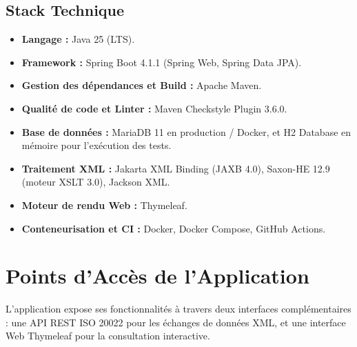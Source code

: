 \documentclass[12pt,a4paper]{article}
\begin{document}
\subsection{Stack Technique}

\begin{itemize}[leftmargin=*]
    \item \textbf{Langage :} Java 25 (LTS).
    \item \textbf{Framework :} Spring Boot 4.1.1 (Spring Web, Spring Data JPA).
    \item \textbf{Gestion des dépendances et Build :} Apache Maven.
    \item \textbf{Qualité de code et Linter :} Maven Checkstyle Plugin 3.6.0.
    \item \textbf{Base de données :} MariaDB 11 en production / Docker, et H2 Database en mémoire pour l'exécution des tests.
    \item \textbf{Traitement XML :} Jakarta XML Binding (JAXB 4.0), Saxon-HE 12.9 (moteur XSLT 3.0), Jackson XML.
    \item \textbf{Moteur de rendu Web :} Thymeleaf.
    \item \textbf{Conteneurisation et CI :} Docker, Docker Compose, GitHub Actions.
\end{itemize}

\newpage

\section{Points d'Accès de l'Application}

L'application expose ses fonctionnalités à travers deux interfaces complémentaires : une API REST ISO 20022 pour les échanges de données XML, et une interface Web Thymeleaf pour la consultation interactive.
\end{document}
